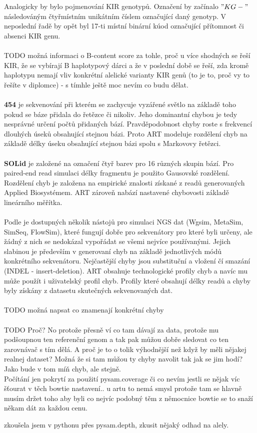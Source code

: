 \documentclass[czech,DP]{thesiskiv}
\numberwithin{equation}{section}
\begin{document}
\noindent
Analogicky by bylo pojmenování KIR genotypů. Označení by začínalo \mbox{$"KG-"$} následováným čtyřmístním unikátním číslem označující daný genotyp. V neposlední řadě by opět byl 17-ti místní binární kúod označující přítomnost či absenci KIR genu.
\\
\\
TODO možná informaci o B-content score za tohle, proč u více shodných se řeší KIR, že se vybírají B haplotypový dárci a že v poslední době se řeší, zda kromě haplotypu nemají vliv konkrétní alelické varianty KIR genů (to je to, proč vy to řešíte v diplomce) - s tímhle ještě moc nevím co budu dělat.
\\
\\
\textbf{454} je sekvenování při kterém se zachycuje vyzářené světlo na základě toho pokud se báze přidala do řetězce či nikoliv. Jeho dominantní chybou je tedy nesprávné určení počtů přidaných bází. Pravděpodobnost chyby roste s frekvencí dlouhých úseků obsahující stejnou bázi. Proto ART modeluje rozdělení chyb na základě délky úseku obsahující stejnou bázi spolu s Markovovy řetězci.
\\
\\
\textbf{SOLid} je založené na označení čtyř barev pro 16 různých skupin bází. Pro paired-end read simulaci délky fragmentu je použito Gausovské rozdělení. Rozdělení chyb je založena na empirické znalosti získané z readů generovaných Applied Biosystémem. ART zároveň nabází nastavené chybovosti základě lineárního měřítka. 
\\
\\
Podle \cite{art} je dostupných několik nástojů pro simulaci NGS dat (Wgsim, MetaSim, SimSeq, FlowSim), které fungují dobře pro sekvenátory pro které byli určeny, ale žádný z nich se nedokázal vypořádat se všemi nejvíce používanými. Jejich slabinou je především v generovaní chyb na základě jednotlivých módů konkrétního sekvenátoru. Nejčastější chyby jsou substituční a vložení čí smazání (INDEL - insert-deletion). ART obsahuje technologické profily chyb a navíc mu může použít i uživatelský profil chyb. Profily které obsahují délky readů a chyby byly získány z datasetu skutečných sekvenovaných dat. 
\\
\\
TODO možná napsat co znamenají konkrétní chyby
\\
\\
TODO
Proč? No protože přesně ví co tam dávají za data, protože mu podšoupnou ten referenční genom a tak pak můžou dobře sledovat co ten zarovnávač s tím dělá. 
A proč je to o tolik výhodnější než když by měli nějakej realnej dataset? 
Možná že si tam můžou ty chyby navolit tak jak se jim hodí?
Jako bude v tom míň chyb, ale stejně.
\\
	Počítání jen pokrytí za použití pysam.coverage či co 
	nevím jestli se nějak víc šťourat v těch bowtie nastavení.. u artu to nemá smysl protože tam se hlavně musím držet toho aby byli co nejvíc podobný těm z němocnice
 bowtie se to snaží někam dát za každou cenu.



zkoušela jsem v pythonu přes pysam.depth, zkusit nějaký odhad na alely. 
\end{document}

